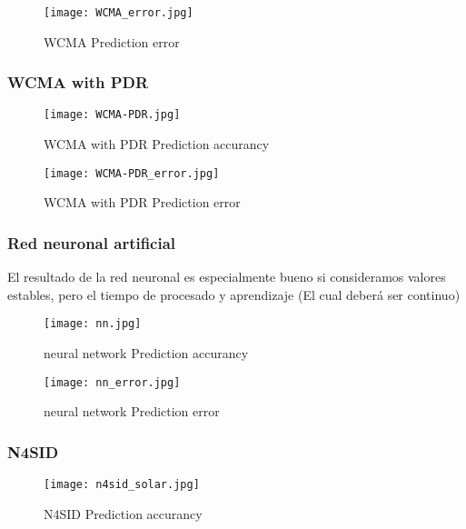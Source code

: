 \begin{figure}[h]
    \texttt{[image: WCMA\_error.jpg]}
    \caption{WCMA Prediction error}
    \label{fig:wcma_error}
\end{figure}


\subsubsection{WCMA with PDR} 
\label{ssub:wcma_with_pdr}

\begin{figure}[h]
    \texttt{[image: WCMA-PDR.jpg]}
    \caption{WCMA with PDR Prediction accurancy}
    \label{fig:wcmapdr_comp}
\end{figure}

\begin{figure}[h]
    \texttt{[image: WCMA-PDR\_error.jpg]}
    \caption{WCMA with PDR Prediction error}
    \label{fig:wcmapdr_error}
\end{figure}


\subsubsection{Red neuronal artificial} 
\label{ssub:nn}

El resultado de la red neuronal es especialmente bueno si consideramos valores estables, pero el tiempo de procesado y aprendizaje (El cual deberá ser continuo)

\begin{figure}[h]
    \texttt{[image: nn.jpg]}
    \caption{neural network Prediction accurancy}
    \label{fig:nn_comp}
\end{figure}

\begin{figure}[h]
    \texttt{[image: nn\_error.jpg]}
    \caption{neural network Prediction error}
    \label{fig:nn_error}
\end{figure}


\subsubsection{N4SID} 
\label{ssub:n4sid}

\begin{figure}[h]
    \texttt{[image: n4sid\_solar.jpg]}
    \caption{N4SID Prediction accurancy}
\end{figure}




